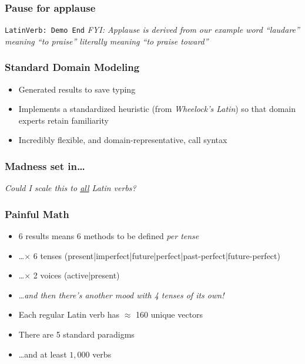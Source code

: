 \documentclass[slidestop,compress,mathserif]{beamer}
\begin{document}
\begin{frame}
	\frametitle{Pause for applause}
	\begin{center}
		\texttt{LatinVerb:  Demo End}
		\vskip 0.5cm
		\emph{FYI:  Applause is derived from our example word ``laudare'' meaning ``to praise'' literally meaning ``to praise toward''}
	\end{center}	
\end{frame}


\begin{frame}
	\frametitle{Standard Domain Modeling}
	\begin{itemize}
		\item Generated results to save typing
		\pause
		\item Implements a standardized heuristic (from \emph{Wheelock's Latin}) so that domain experts retain familiarity
		\pause
		\item Incredibly flexible, and domain-representative, call syntax
	\end{itemize}
\end{frame}

\begin{frame}
	\frametitle{Madness set in\ldots}
	\vskip 1.0cm
	\emph{Could I scale this to \underline{all} Latin verbs?}
\end{frame}

\begin{frame}
	\frametitle{Painful Math}
	\begin{itemize}
		\item 6 results means 6 methods to be defined \emph{per tense}
		\pause
		\item \ldots $\times$ 6 tenses (present|imperfect|future|perfect|past-perfect|future-perfect)
		\pause
		\item \ldots $\times$ 2 voices (active|present)
		\pause
		\item \ldots \emph{and then there's another mood with 4 tenses of its own!}
		\pause
		\item Each regular Latin verb has $\approx$  160 unique vectors
		\pause
		\item There are 5 standard paradigms
		\pause
		\item \ldots and at least $1,000$ verbs
	\end{itemize}
\end{frame}
\end{document}

